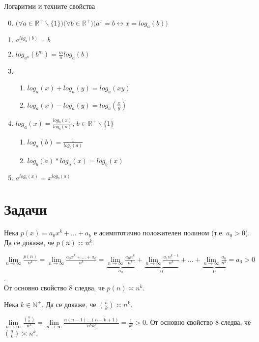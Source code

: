 \begin{boxfact}{Логаритми и техните свойства}{}\label{fact-log-props}
	\begin{enumerate}
		\setcounter{enumi}{-1}
		\item $\big(\forall a\in\mathbb{R}^+\backslash\{1\}\big)\big(\forall b\in\mathbb{R}^+\big)\big(a^x=b\leftrightarrow x=log_a(b)\big)$
		\item $a^{log_a(b)}=b$
		\item $log_{a^n}(b^m)=\frac mnlog_a(b)$
		\item
		\begin{enumerate}
			\item $log_a(x)+log_a(y)=log_a(xy)$
			\item $log_a(x)-log_a(y)=log_a(\frac{x}{y})$
		\end{enumerate}
		\item $log_a(x)=\frac{log_b(x)}{log_b(a)},\,b\in\mathbb{R}^+\backslash\{1\}$
		\begin{enumerate}
			\item $log_a(b)=\frac{1}{log_b(a)}$
			\item $log_b(a)*log_a(x)=log_b(x)$
		\end{enumerate}
		\item $a^{log_b(x)}=x^{log_b(a)}$
	\end{enumerate}
\end{boxfact}\leavevmode\newline


\section{Задачи}

\begin{problem}
	Нека $p(x)=a_0x^k+\dots+a_k$ е асимптотично положителен полином (т.е. $a_0>0$). Да се докаже, че $p(n)\asymp n^k$.
\end{problem}
\begin{solution}
	$\lim\limits_{n\to\infty}\frac{p(n)}{n^k}=\lim\limits_{n\to\infty}\frac{a_0x^k+\dots+a_k}{n^k}=\underbrace{\lim\limits_{n\to\infty}\frac{a_0n^k}{n^k}}_{a_0}+\underbrace{\lim\limits_{n\to\infty}\frac{a_1n^{k-1}}{n^k}}_0+\dots+\underbrace{\lim\limits_{n\to\infty}\frac{a_n}{n^k}}_0=a_0>0$.\\
	От основно свойство $\hyperref[mprop-1]{8}$ следва, че $p(n)\asymp n^k$.
\end{solution}\leavevmode\newline

\begin{problem}
	Нека $k\in\mathbb{N}^+$. Да се докаже, че $\binom nk\asymp n^k$.
\end{problem}
\begin{solution}
	$\lim\limits_{n\to\infty}\frac{\binom nk}{n^k}=\lim\limits_{n\to\infty}\frac{n(n-1)\dots(n-k+1)}{n^kk!}=\frac1{k!}>0$.
	От основно свойство $\hyperref[mprop-1]{8}$ следва, че $\binom nk\asymp n^k$.
\end{solution}\leavevmode\newline

